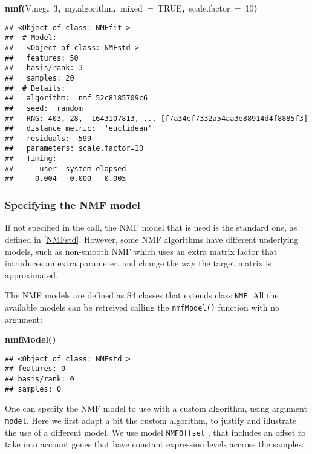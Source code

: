 \documentclass[a4paper]{article}\usepackage{graphicx, color}
\makeatletter
\newcommand{\hlnumber}[1]{\textcolor[rgb]{0,0,0}{#1}}%
\newcommand{\hlfunctioncall}[1]{\textcolor[rgb]{0.501960784313725,0,0.329411764705882}{\textbf{#1}}}%
\newcommand{\hlkeyword}[1]{\textcolor[rgb]{0,0,0}{\textbf{#1}}}%
\newcommand{\hlargument}[1]{\textcolor[rgb]{0.690196078431373,0.250980392156863,0.0196078431372549}{#1}}%
\newcommand{\hlsymbol}[1]{\textcolor[rgb]{0,0,0}{#1}}%
\newcommand{\hlstd}[1]{\textcolor[rgb]{0,0,0}{#1}}%
\newenvironment{kframe}{%
 \def\FrameCommand##1{\hskip\@totalleftmargin \hskip-\fboxsep
 \colorbox{shadecolor}{##1}\hskip-\fboxsep
     \hskip-\linewidth \hskip-\@totalleftmargin \hskip\columnwidth}%
 \MakeFramed {\advance\hsize-\width
   \@totalleftmargin\z@ \linewidth\hsize
   \@setminipage}}%
 {\par\unskip\endMakeFramed}
\newenvironment{knitrout}{}{} %
\let\code=\texttt
\makeatother
\begin{document}
\begin{knitrout}
\begin{kframe}
\begin{flushleft}
\hlstd{}\hlfunctioncall{nmf}\hlkeyword{(}\hlsymbol{V.neg}\hlkeyword{,}{\ }\hlnumber{3}\hlkeyword{,}{\ }\hlsymbol{my.algorithm}\hlkeyword{,}{\ }\hlargument{mixed}{\ }\hlargument{=}{\ }\hlnumber{TRUE}\hlkeyword{,}{\ }\hlargument{scale.factor}{\ }\hlargument{=}{\ }\hlnumber{10}\hlkeyword{)}\mbox{}
\normalfont
\end{flushleft}
\begin{verbatim}
## <Object of class: NMFfit >
##  # Model:
##   <Object of class: NMFstd >
##   features: 50 
##   basis/rank: 3 
##   samples: 20 
##  # Details:
##   algorithm:  nmf_52c8185709c6 
##   seed:  random 
##   RNG: 403, 28, -1643107813, ... [f7a34ef7332a54aa3e88914d4f8885f3]
##   distance metric:  'euclidean' 
##   residuals:  599 
##   parameters: scale.factor=10 
##   Timing:
##      user  system elapsed 
##     0.004   0.000   0.005 
\end{verbatim}
\end{kframe}
\end{knitrout}


\subsubsection{Specifying the NMF model}
If not specified in the call, the NMF model that is used is the standard one, as defined in \cref{NMFstd}. 
However, some NMF algorithms have different underlying models, such as non-smooth NMF \cite{Pascual-Montano2006} which uses an extra matrix factor that introduces an extra parameter, and change the way the target matrix is approximated.

The NMF models are defined as S4 classes that extends class \code{NMF}. All the available models can be retreived calling the \code{nmfModel()} function with no 
argument:

\begin{knitrout}
\color{fgcolor}\begin{kframe}
\begin{flushleft}
\ttfamily\noindent
\hlfunctioncall{nmfModel}\hlkeyword{(}\hlkeyword{)}\mbox{}
\normalfont
\end{flushleft}
\begin{verbatim}
## <Object of class: NMFstd >
## features: 0 
## basis/rank: 0 
## samples: 0 
\end{verbatim}
\end{kframe}
\end{knitrout}

 
One can specify the NMF model to use with a custom algorithm, using argument \code{model}. Here we first adapt a bit the custom algorithm, to justify and illustrate the use of a different model.
We use model \code{NMFOffset} \cite{Badea2008}, that includes an offset to take into account genes that have constant expression levels accross the samples:
\end{document}
